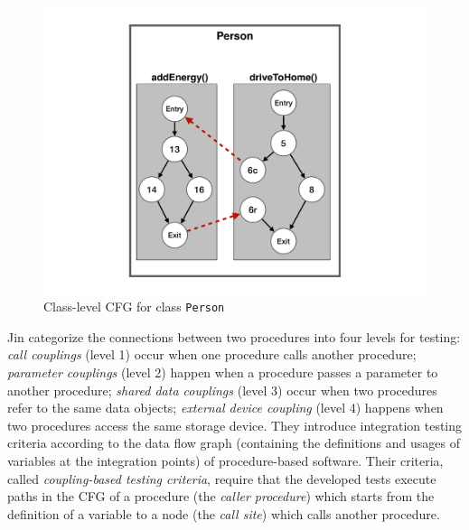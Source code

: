 \begin{figure}[t]
    \centering
	\includegraphics[width=0.85\linewidth]{papers/cling/figures/CCFG_new}
	\caption{Class-level CFG for class \texttt{Person}}
  \label{fig:cling:CCFG}
\end{figure}


 Jin \etal \cite{Jin1998} categorize the connections between two procedures into four levels for testing: \textit{call couplings} (level 1) occur when one procedure calls another procedure; \textit{parameter couplings} (level 2) happen when a procedure passes a parameter to another procedure; \textit{shared data couplings} (level 3) occur when two procedures refer to the same data objects; \textit{external device coupling} (level 4) happens when two procedures access the same storage device.
They introduce integration testing criteria according to the data flow graph (containing the definitions and usages of variables at the integration points) of procedure-based software. Their criteria, called \textit{coupling-based testing criteria}, require that the developed tests execute paths in the CFG of a procedure (the \textit{caller procedure}) which starts from the definition of a variable to a node (the \textit{call site}) which calls another procedure.

